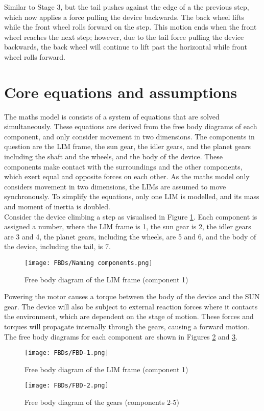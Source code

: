 Similar to Stage 3, but the tail pushes against the edge of a the previous step, which now applies a force pulling the device backwards. The back wheel lifts while the front wheel rolls forward on the step. This motion ends when the front wheel reaches the next step; however, due to the tail force pulling the device backwards, the back wheel will continue to lift past the horizontal while front wheel rolls forward.\\


\section{Core equations and assumptions}

The maths model is consists of a system of equations that are solved simultaneously. These equations are derived from the free body diagrams of each component, and only consider movement in two dimensions. The components in question are the LIM frame, the sun gear, the idler gears, and the planet gears including the shaft and the wheels, and the body of the device. These components make contact with the surroundings and the other components, which exert equal and opposite forces on each other. As the maths model only considers movement in two dimensions, the LIMs are assumed to move synchronously. To simplify the equations, only one LIM is modelled, and its mass and moment of inertia is doubled.\\

Consider the device climbing a step as visualised in Figure \ref{Component-names}. Each component is assigned a number, where the LIM frame is 1, the sun gear is 2, the idler gears are 3 and 4, the planet gears, including the wheels, are 5 and 6, and the body of the device, including the tail, is 7.
\begin{figure}[h]
	\centering
	\texttt{[image: FBDs/Naming components.png]}
	\caption{Free body diagram of the LIM frame (component 1)}
	\label{Component-names}
\end{figure}
Powering the motor causes a torque between the body of the device and the SUN gear. The device will also  be subject to external reaction forces where it contacts the environment, which are dependent on the stage of motion. These forces and torques will propagate internally through the gears, causing a forward motion. The free body diagrams for each component are shown in Figures \ref{FBD-1} and \ref{FBD-2}.\\
\begin{figure}[h]
	\centering
	\texttt{[image: FBDs/FBD-1.png]}
	\caption{Free body diagram of the LIM frame (component 1)}
	\label{FBD-1}
\end{figure}
\begin{figure}[!h]
	\centering
	\texttt{[image: FBDs/FBD-2.png]}
	\caption{Free body diagram of the gears (components 2-5)}
	\label{FBD-2}
\end{figure}

